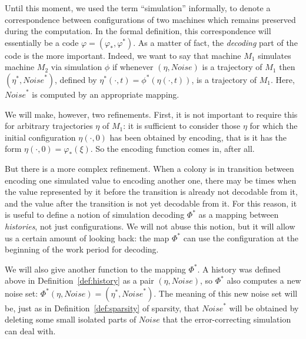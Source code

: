 \documentclass[12pt]{memoir}
\newcommand{\Noise}{\mathit{Noise}}
\begin{document}
Until this moment, we used the term ``simulation'' informally, to denote
a correspondence between configurations of
two machines which remains preserved during the computation.
In the formal definition, this correspondence will essentially be a code
\( \varphi=(\varphi_{*},\varphi^{*}) \).
As a matter of fact, the \emph{decoding} part of the code is the more important.
Indeed, we want to say that machine \( M_{1} \) simulates machine \( M_{2} \) via
simulation \( \phi \) if whenever \( (\eta, \Noise) \) is a trajectory of \( M_{1} \) 
then \( (\eta^{*},\Noise^{*}) \),
defined by \( \eta^{*}(\cdot,t)=\phi^{*}(\eta(\cdot,t)) \), is a
trajectory of \( M_{1} \).
Here, \( \Noise^{*} \) is computed by an appropriate mapping.

We will make, however, two refinements.
First, it is not important to require this for arbitrary trajectories \( \eta \) of \( M_{1} \):
it is sufficient to consider those \( \eta \) for which the initial configuration
 \( \eta(\cdot,0) \) has been obtained by encoding, that is it has the form 
\( \eta(\cdot,0)=\varphi_{*}(\xi) \).
So the encoding function comes in, after all.

But there is a more complex refinement.
When a colony is in transition between encoding one simulated value to encoding another one,
there may be times when the value represented by it before the transition
is already not decodable from it, and the value after the transition is not yet decodable from it.
For this reason, it is useful to define a notion of simulation decoding \( \Phi^{*} \)
as a mapping between \emph{histories}, not just configurations.
We will not abuse this notion, but it will allow us a certain amount of looking back:
the map \( \Phi^{*} \) can use the configuration at the beginning of the work period for decoding.

We will also give another function to the mapping \( \Phi^{*} \).
A history was defined above in Definition~\ref{def:history} 
as a pair \( (\eta,\Noise) \),
so \( \Phi^{*} \) also computes a new noise set:
\( \Phi^{*}(\eta,\Noise)=(\eta^{*},\Noise^{*}) \).
The meaning of this new noise set will be, just as in Definition~\ref{def:sparsity} of sparsity,
that 
\( \Noise^{*} \) will be obtained by deleting some small isolated parts of \( \Noise \) that the 
error-correcting simulation can deal with.
\end{document}
